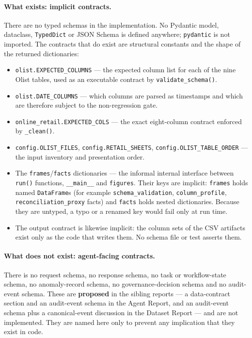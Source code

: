 \documentclass[11pt,a4paper]{article}
\newcommand{\code}[1]{\texttt{#1}}
\begin{document}
\paragraph{What exists: implicit contracts.} There are no typed schemas in the implementation. No Pydantic model, dataclass, \code{TypedDict} or JSON Schema is defined anywhere; \code{pydantic} is not imported. The contracts that do exist are structural constants and the shape of the returned dictionaries:
\begin{itemize}
\item \code{olist.EXPECTED\_COLUMNS} --- the expected column list for each of the nine Olist tables, used as an executable contract by \code{validate\_schema()}.
\item \code{olist.DATE\_COLUMNS} --- which columns are parsed as timestamps and which are therefore subject to the non-regression gate.
\item \code{online\_retail.EXPECTED\_COLS} --- the exact eight-column contract enforced by \code{\_clean()}.
\item \code{config.OLIST\_FILES}, \code{config.RETAIL\_SHEETS}, \code{config.OLIST\_TABLE\_ORDER} --- the input inventory and presentation order.
\item The \code{frames}/\code{facts} dictionaries --- the informal internal interface between \code{run()} functions, \code{\_\_main\_\_} and \code{figures}. Their keys are implicit: \code{frames} holds named \texttt{DataFrame}s (for example \code{schema\_validation}, \code{column\_profile}, \code{reconciliation\_proxy} facts) and \code{facts} holds nested dictionaries. Because they are untyped, a typo or a renamed key would fail only at run time.
\item The output contract is likewise implicit: the column sets of the CSV artifacts exist only as the code that writes them. No schema file or test asserts them.
\end{itemize}

\paragraph{What does not exist: agent-facing contracts.} There is no request schema, no response schema, no task or workflow-state schema, no anomaly-record schema, no governance-decision schema and no audit-event schema. These are \textbf{proposed} in the sibling reports --- a data-contract section and an audit-event schema in the Agent Report, and an audit-event schema plus a canonical-event discussion in the Dataset Report --- and are not implemented. They are named here only to prevent any implication that they exist in code.
\end{document}
